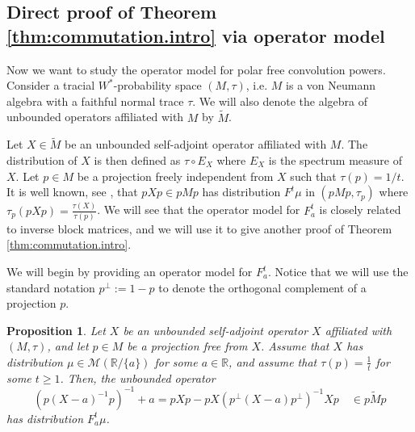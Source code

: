 \documentclass[reqno,11pt]{amsart}
\newtheorem{proposition}[theorem]{Proposition}
\theoremstyle{remark}
\newcommand{\rr}{\mathbb{R}}
\newcommand{\MM}{\mathcal{M}}
\newcommand{\freepower}[1]{F^{#1}}
\newcommand{\pfreepower}[2]{F_{#1}^{#2}}
\begin{document}
\subsection{Direct proof of Theorem \ref{thm:commutation.intro} via operator model}

Now we want to study the operator model for polar free convolution powers.  Consider a tracial $W^*$-probability space $(M,\tau)$, i.e. $ M $ is a von Neumann algebra with a faithful normal trace $\tau$. We will also denote the algebra of unbounded operators affiliated with $ M $ by $ \widetilde{M} $.

Let $ X \in \widetilde{M}$ be an unbounded self-adjoint operator affiliated with $M$. The distribution of $X$ is then defined as $\tau\circ E_X$ where $ E_X $ is the spectrum measure of $X$. Let $p\in M$ be a projection freely independent from $X$ such that $ \tau(p) = 1/t $. It is well known, see \cite[Application 1.11]{nica1996multiplicative}, that $ pXp\in pMp $ has distribution $ \freepower{t}\mu $ in $ (pMp,\tau_p) $ where $\tau_p(pXp)=\frac{\tau(X)}{\tau(p)}$.
We will see that the operator model for $\pfreepower{a}{t}$ is closely related to inverse block matrices, and we will use it to give another proof of Theorem \ref{thm:commutation.intro}.

We will begin by providing an operator model for $\pfreepower{a}{t}$. Notice that we will use the standard notation $p^{\perp}:=1-p$ to denote the orthogonal complement of a projection $p$. 


\begin{proposition}\label{operator model}
    Let $X$ be an unbounded self-adjoint operator $ X $ affiliated with $(M,\tau)$, and let $p\in M$ be a projection free from $ X $. Assume that $X$ has distribution $\mu \in \MM(\rr/\{a\})$ for some $a\in {\rr}$, and assume that $\tau(p)=\tfrac{1}{t}$ for some $t\geq 1$. Then, the unbounded operator
    $$ (p(X-a)^{-1}p)^{-1}+a = pXp- pX\left( p^{\perp}(X-a) p^{\perp}\right)^{-1}Xp \quad \in \widetilde{pMp} $$
    has distribution $ \pfreepower{a}{t}\mu $.
\end{proposition}
\end{document}
